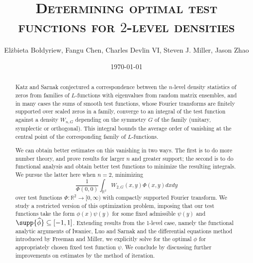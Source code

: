 \documentclass[12pt, reqno]{amsart}
\title
{
	\textsc{Determining optimal test functions for $2$-level densities}
}
\author{El\.zbieta Bo\l dyriew, Fangu Chen, Charles Devlin VI, Steven J. Miller, Jason Zhao}
\date{\today}
\numberwithin{equation}{section}
\theoremstyle{definition}
\theoremstyle{remark}
\begin{document}
\begin{titlepage}
\maketitle
\thispagestyle{empty}
\begin{abstract}
	Katz and Sarnak conjectured a
correspondence between the $n$-level density statistics of zeros from
families of $L$-functions
with eigenvalues from random matrix ensembles, and in many cases the sums of smooth test functions, whose Fourier transforms are
finitely supported over scaled zeros in a family, converge to an integral of
the test function against a density $W_{n, G}$ depending on the
symmetry $G$ of the family (unitary, symplectic or orthogonal). This integral bounds the average order of vanishing at the central point of the corresponding family of $L$-functions. 

We can obtain better estimates on this vanishing in two ways. The first is
to do more number theory, and prove results for larger $n$ and greater
support; the second is to do functional analysis and obtain better test
functions to minimize the resulting integrals. We pursue the latter here
when $n=2$, minimizing  
	\[ \frac{1}{\Phi(0, 0)} \int_{{\mathbb R}^2} W_{2,G} (x, y) \Phi(x, y) dx dy \] 
over test functions $\Phi : {\mathbb R}^2
\to [0, \infty)$ with compactly supported Fourier transform. We study a
restricted version of this optimization problem, imposing that our test
functions take the form $\phi(x) \psi(y)$ for some fixed admissible $\psi(y)$ and
$\supp{\widehat \phi} \subseteq [-1, 1]$. Extending results from the 1-level case, namely the functional analytic arguments of Iwaniec, Luo and Sarnak and the differential equations method introduced by Freeman and Miller, we explicitly solve for the optimal $\phi$ for appropriately chosen fixed test function $\psi$. We conclude by discussing further improvements on estimates by the method of iteration.
\end{abstract}

\tableofcontents
\end{titlepage}

\end{document}
